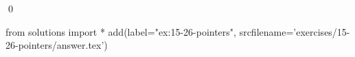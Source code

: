 
\begin{ex}
  \label{ex:15-26-pointers}
  
  \qed
\end{ex}
\begin{python0}
from solutions import *
add(label="ex:15-26-pointers",
    srcfilename='exercises/15-26-pointers/answer.tex')
\end{python0}
